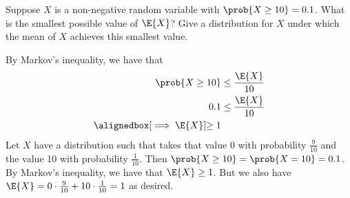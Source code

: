 \documentclass[%
  hwnumber=7,%
  studentnumber=20053722,%
  {name=Bryan Hoang}%
]{%
  mthe353answer%
}
\begin{document}
  \begin{questions}
    \setcounter{question}{2}
    \question{}\
    \begin{parts}
      \part{}
      Suppose \(X\) is a non-negative random variable with \(\prob{X \ge 10} = 0.1\).
      What is the smallest possible value of \(\E{X}\)?  Give a distribution for
      \(X\) under which the mean of \(X\) achieves this smallest value.
      \begin{solution}
        By Markov's inequality, we have that
        \begin{align*}
          \prob{X \ge 10} &\le \frac{\E{X}}{10}\\
          0.1 &\le \frac{\E{X}}{10}\\
          \alignedbox[\implies \E{X}]{\ge 1}
        \end{align*}
        Let \(X\) have a distribution such that takes that value 0 with
        probability \(\frac{9}{10}\) and the value 10 with probability
        \(\frac{1}{10}\). Then \(\prob{X \ge 10} = \prob{X = 10} = 0.1\). By
        Markov's inequality, we have that \(\E{X} \ge 1\). But we also have
        \(\E{X} = 0 \cdot \frac{9}{10} + 10 \cdot \frac{1}{10} = 1\) as desired.
      \end{solution}

\end{parts}
\end{questions}
\end{document}
